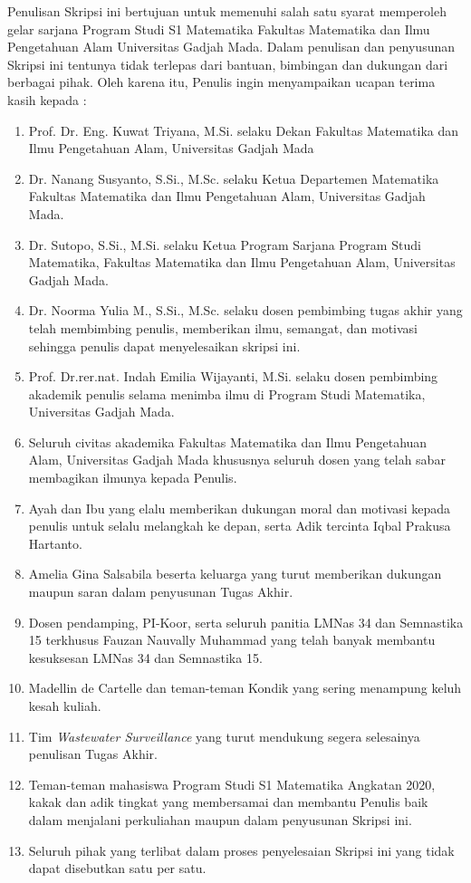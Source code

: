 \documentclass{skripsimathugm}
\begin{document}
Penulisan Skripsi ini bertujuan untuk memenuhi salah satu syarat memperoleh gelar sarjana Program Studi S1 Matematika Fakultas Matematika dan Ilmu Pengetahuan Alam Universitas Gadjah Mada. Dalam penulisan dan penyusunan Skripsi ini tentunya tidak terlepas dari bantuan, bimbingan dan dukungan dari berbagai pihak. Oleh karena itu, Penulis ingin menyampaikan ucapan terima kasih
kepada :

\begin{enumerate}
    \item Prof. Dr. Eng. Kuwat Triyana, M.Si. selaku Dekan Fakultas Matematika dan Ilmu Pengetahuan Alam, Universitas Gadjah Mada
    \item Dr. Nanang Susyanto, S.Si., M.Sc. selaku Ketua Departemen Matematika Fakultas Matematika dan Ilmu Pengetahuan Alam, Universitas Gadjah Mada.
    \item Dr. Sutopo, S.Si., M.Si. selaku Ketua Program Sarjana Program Studi Matematika, Fakultas Matematika dan Ilmu Pengetahuan Alam, Universitas Gadjah Mada.
    \item Dr. Noorma Yulia M., S.Si., M.Sc. selaku dosen pembimbing tugas akhir yang telah membimbing penulis, memberikan ilmu, semangat, dan motivasi sehingga penulis dapat menyelesaikan skripsi ini.
    \item Prof. Dr.rer.nat. Indah Emilia Wijayanti, M.Si. selaku dosen pembimbing akademik penulis selama menimba ilmu di Program Studi Matematika, Universitas Gadjah Mada.
    \item Seluruh civitas akademika Fakultas Matematika dan Ilmu Pengetahuan Alam, Universitas Gadjah Mada khususnya seluruh dosen yang telah sabar membagikan ilmunya kepada Penulis.
    \item Ayah dan Ibu yang elalu memberikan dukungan moral dan motivasi kepada penulis untuk selalu melangkah ke depan, serta Adik tercinta Iqbal Prakusa Hartanto.
    \item Amelia Gina Salsabila beserta keluarga yang turut memberikan dukungan maupun saran dalam penyusunan Tugas Akhir.
    \item Dosen pendamping, PI-Koor, serta seluruh panitia LMNas 34 dan Semnastika 15 terkhusus Fauzan Nauvally Muhammad yang telah banyak membantu kesuksesan LMNas 34 dan Semnastika 15.
    \item Madellin de Cartelle dan teman-teman Kondik yang sering menampung keluh kesah kuliah.
    \item Tim \textit{Wastewater Surveillance} yang turut mendukung segera selesainya penulisan Tugas Akhir.
    \item Teman-teman mahasiswa Program Studi S1 Matematika Angkatan 2020, kakak dan adik tingkat yang membersamai dan membantu Penulis baik dalam menjalani perkuliahan maupun dalam penyusunan Skripsi ini.
    \item Seluruh pihak yang terlibat dalam proses penyelesaian Skripsi ini yang tidak dapat disebutkan satu per satu.
\end{enumerate}
\end{document}
